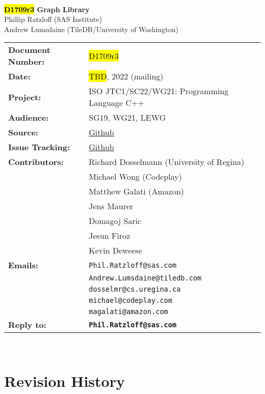 \documentclass[10pt,onecolumn]{article}
\begin{document}
\begin{titlepage}
~
\vfill
\begin{center}
\LARGE
\textbf{\hl{D1709r3} Graph Library}\\
\vspace{12pt}
\normalsize
	Phillip Ratzloff (SAS Institute)\\
	Andrew Lumsdaine (TileDB/University of Washington)\\
\end{center}
\vspace{32pt}
\begin{tabular}{ll}
\textbf{Document Number:} & \hl{D1709r3} \\
\textbf{Date:} & \hl{TBD}, 2022 (mailing)\\ 
\textbf{Project:} & ISO JTC1/SC22/WG21: Programming Language C++\\
\textbf{Audience:} & SG19, WG21, LEWG\\
\textbf{Source:} & \href{https://github.com/stdgraph/graph-v2}{Github} \\
\textbf{Issue Tracking:} & \href{https://github.com/stdgraph/graph-v2/issues}{Github} \\
\textbf{Contributors:}
	&Richard Dosselmann (University of Regina)\\
	&Michael Wong (Codeplay)\\
	&Matthew Galati (Amazon)\\	
	&Jens Maurer\\
	&Domagoj Saric\\
	&Jesun Firoz\\
	&Kevin Deweese\\
\textbf{Emails:}
	&\texttt{Phil.Ratzloff@sas.com}\\
	&\texttt{Andrew.Lumsdaine@tiledb.com}\\
	&\texttt{dosselmr@cs.uregina.ca}\\
	&\texttt{michael@codeplay.com}\\
	&\texttt{magalati@amazon.com}\\
\textbf{Reply to:}
	&\texttt{\textbf{Phil.Ratzloff@sas.com}}\\
\end{tabular}
\vfill
~
\end{titlepage}

\tableofcontents

\clearpage

\section*{Revision History}
\end{document}
